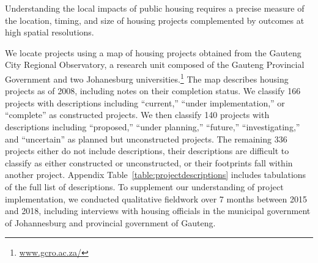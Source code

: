\documentclass[12pt]{article}
\begin{document}
Understanding the local impacts of public housing requires a precise measure of the location, timing, and size of housing projects complemented by outcomes at high spatial resolutions.

We locate projects using a map of housing projects obtained from the Gauteng City Regional Observatory, a research unit composed of the Gauteng Provincial Government and two Johanesburg universities.\footnote{\href{url}{www.gcro.ac.za/}}  The map describes housing projects as of 2008, including notes on their completion status.  We classify 166 projects with descriptions including ``current,'' ``under implementation,'' or ``complete'' as constructed projects.  We then classify 140 projects with descriptions including ``proposed,'' ``under planning,'' ``future,'' ``investigating,'' and ``uncertain'' as planned but unconstructed projects.  The remaining 336 projects either do not include descriptions, their descriptions are difficult to classify as either constructed or unconstructed, or their footprints fall within another project.  Appendix Table~\ref{table:projectdescriptions} includes tabulations of the full list of descriptions.  To supplement our understanding of project implementation, we conducted qualitative fieldwork over 7 months between 2015 and 2018, including interviews with housing officials in the municipal government of Johannesburg and provincial government of Gauteng. 


\end{document}

